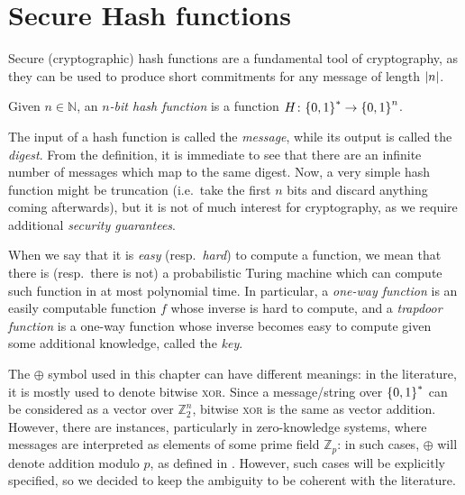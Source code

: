 \section{Secure Hash functions}\label{sec:hash_functions}
Secure (cryptographic) hash functions are a fundamental tool of cryptography, as they can be used 
to produce short commitments for any message of length \(\left\lvert n\right\rvert\).
\begin{definition}
  Given \(n \in \mathbb{N}\), an \emph{\(n\)-bit hash function} is a function 
  \(H\colon \Set{0, 1}^{*} \to \Set{0, 1}^{n}\).
\end{definition}
The input of a hash function is called the \emph{message}, while its output is called the 
\emph{digest}.
From the definition, it is immediate to see that there are an infinite number of messages which map
to the same digest.
Now, a very simple hash function might be truncation (i.e.\ take the first \(n\) bits and discard 
anything coming afterwards), but it is not of much interest for cryptography, as we require 
additional \emph{security guarantees}.
\begin{remark}
  When we say that it is \emph{easy} (resp.\  \emph{hard}) to compute a function, we mean that 
  there is (resp.\ there is not) a probabilistic Turing machine which can compute such function in
  at most polynomial time.
  In particular, a \emph{one-way function} is an easily computable function \(f\) whose inverse is 
  hard to compute, and a \emph{trapdoor function} is a one-way function whose inverse becomes easy 
  to compute given some additional knowledge, called the \emph{key}.
\end{remark}

\begin{remark}\label{rem:xor_vs_add}
	The \(\oplus \) symbol used in this chapter can have different meanings: in the literature, 
	it is mostly used to denote bitwise \textsc{xor}. Since a message/string over \(\left\{0, 1\right\}^{*}\) 
	can be considered as a vector over \(\mathbb{Z}_{2}^n\), bitwise \textsc{xor} is the same as 
	vector addition.
	However, there are instances, particularly in zero-knowledge systems, where messages are interpreted as 
	elements of some prime field \(\mathbb{Z}_p\): in such cases, \(\oplus \) will denote addition
	modulo \(p\), as defined in .
	However, such cases will be explicitly specified, so we decided to keep the ambiguity to be 
	coherent with the literature.
\end{remark}

